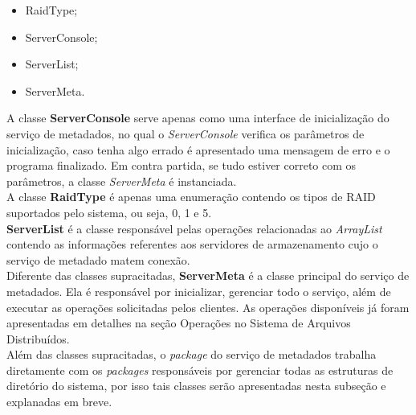 \begin{itemize}
	\item RaidType;
	\item ServerConsole;
	\item ServerList;
	\item ServerMeta.
\end{itemize}

A classe \textbf{ServerConsole} serve apenas como uma interface de inicialização do serviço de metadados, no qual o \textit{ServerConsole} verifica os parâmetros de inicialização, caso tenha algo errado é apresentado uma mensagem de erro e o programa finalizado. Em contra partida, se tudo estiver correto com os parâmetros, a classe \textit{ServerMeta} é instanciada.
\\

A classe \textbf{RaidType} é apenas uma enumeração contendo os tipos de RAID suportados pelo sistema, ou seja, 0, 1 e 5.
\\

\textbf{ServerList } é a classe responsável pelas operações relacionadas ao \textit{ArrayList} contendo as informações referentes aos servidores de armazenamento cujo o serviço de metadado matem conexão.
\\

Diferente das classes supracitadas, \textbf{ServerMeta} é a classe principal do serviço de metadados. Ela é responsável por inicializar, gerenciar todo o serviço, além de executar as operações solicitadas pelos clientes. As operações disponíveis já foram apresentadas em detalhes na seção Operações no Sistema de Arquivos Distribuídos.
\\

Além das classes supracitadas, o \textit{package} do serviço de metadados trabalha diretamente com os \textit{packages} responsáveis por gerenciar todas as estruturas de diretório do sistema, por isso tais classes serão apresentadas nesta subseção e explanadas em breve.
\\

